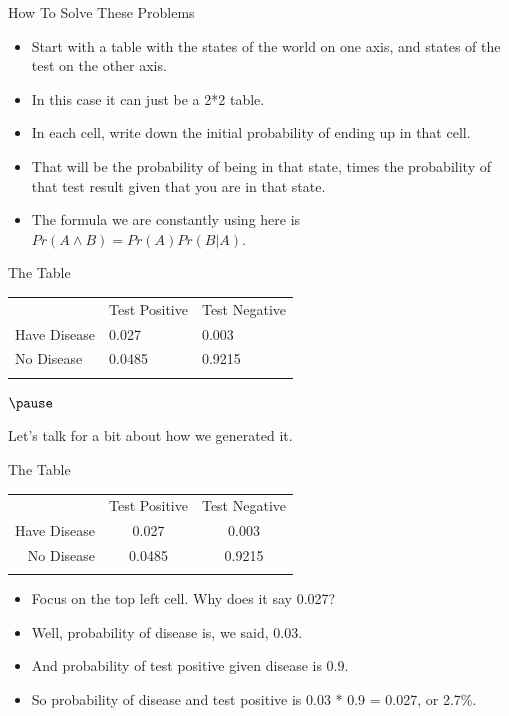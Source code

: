 \documentclass[
  ignorenonframetext,
]{beamer}
\providecommand{\tightlist}{%
  \setlength{\itemsep}{0pt}\setlength{\parskip}{0pt}}
\renewcommand{\,}{\text{, }}
\begin{document}
\begin{frame}{How To Solve These Problems}
\protect\hypertarget{how-to-solve-these-problems}{}
\begin{itemize}
\tightlist
\item
  Start with a table with the states of the world on one axis, and
  states of the test on the other axis.
\item
  In this case it can just be a 2*2 table.
\item
  In each cell, write down the initial probability of ending up in that
  cell.
\item
  That will be the probability of being in that state, times the
  probability of that test result given that you are in that state.
\item
  The formula we are constantly using here is
  \(Pr(A \wedge B) = Pr(A) Pr(B | A)\).
\end{itemize}
\end{frame}

\begin{frame}{The Table}
\protect\hypertarget{the-table}{}
\begin{longtable}[]{@{}lll@{}}
\toprule
& Test Positive & Test Negative \\ \addlinespace
\midrule
\endhead
Have Disease & 0.027 & 0.003 \\ \addlinespace
No Disease & 0.0485 & 0.9215 \\ \addlinespace
\bottomrule
\end{longtable}

\(\pause\)

Let's talk for a bit about how we generated it.
\end{frame}

\begin{frame}{The Table}
\protect\hypertarget{the-table-1}{}
\begin{longtable}[]{@{}rcc@{}}
\toprule
& Test Positive & Test Negative \\ \addlinespace
\midrule
\endhead
Have Disease & 0.027 & 0.003 \\ \addlinespace
No Disease & 0.0485 & 0.9215 \\ \addlinespace
\bottomrule
\end{longtable}

\begin{itemize}
\tightlist
\item
  Focus on the top left cell. Why does it say 0.027?
\item
  Well, probability of disease is, we said, 0.03.
\item
  And probability of test positive given disease is 0.9.
\item
  So probability of disease and test positive is 0.03 * 0.9 = 0.027, or
  2.7\%.
\end{itemize}
\end{frame}
\end{document}
